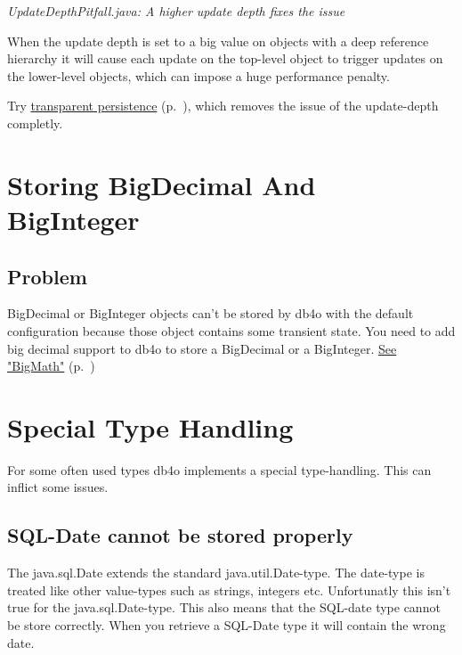 {\small\itshape UpdateDepthPitfall.java: A higher update depth fixes the issue\par}
\medskip

When the update depth is set to a big value on objects with a deep reference hierarchy it will cause each update on the top-level object to trigger updates on the lower-level objects, which can impose a huge performance penalty.

Try \hyperref[ref:basics-update-concept-transparent-persistence]{transparent persistence} (p.~\pageref{ref:basics-update-concept-transparent-persistence}), which removes the issue of the update-depth completly.

\section{Storing BigDecimal And BigInteger}
\label{ref:usage-pitfalls-storing-bigdecimal}

\subsection*{Problem}

BigDecimal or BigInteger objects can't be stored by db4o with the default configuration because those object contains some transient state. You need to add big decimal support to db4o to store a BigDecimal or a BigInteger. \hyperref[ref:advanced-topics-type-handling-bigmath]{See "BigMath"} (p.~\pageref{ref:advanced-topics-type-handling-bigmath})

\section{Special Type Handling}
\label{ref:usage-pitfalls-special-type-handling}

For some often used types db4o implements a special type-handling. This can inflict some issues.

\subsection*{SQL-Date cannot be stored properly}

The java.sql.Date extends the standard java.util.Date-type. The date-type is treated like other value-types such as strings, integers etc. Unfortunatly this isn't true for the java.sql.Date-type. This also means that the SQL-date type cannot be store correctly. When you retrieve a SQL-Date type it will contain the wrong date.

